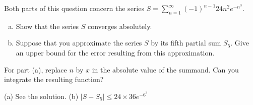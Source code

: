 \begin{question}[2016A]
Both parts of this question concern the series $\displaystyle S = \sum_{n=1}^\infty (-1)^{n-1}24n^2 e^{-n^3}$.
\begin{enumerate}[(a)]
\item
Show that the series $S$ converges absolutely.
\item
Suppose that you approximate the series $S$ by its fifth partial sum $S_5$. Give an upper bound for the error resulting from this approximation.
\end{enumerate}
\end{question}

\begin{hint}
For part (a), replace $n$ by $x$ in the absolute value of the summand.
Can you integrate the resulting function?
\end{hint}

\begin{answer}
(a) See the solution.
\qquad (b)
$|S - S_5 | \le  24 \times 36 e^{-6^3}$

\end{answer}

